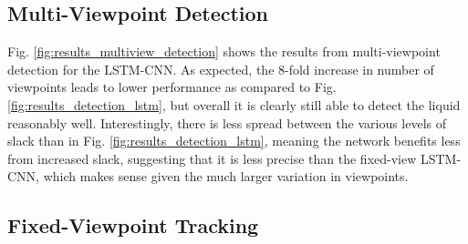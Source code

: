 \documentclass[runningheads,a4paper]{llncs}
\begin{document}
\vspace{-0.3cm}
\subsection{Multi-Viewpoint Detection}
\vspace{-0.3cm}

Fig. \ref{fig:results_multiview_detection} shows the results from multi-viewpoint detection for the LSTM-CNN. As expected, the 8-fold increase in number of viewpoints leads to lower performance as compared to Fig. \ref{fig:results_detection_lstm}, but overall it is clearly still able to detect the liquid reasonably well. Interestingly, there is less spread between the various levels of slack than in Fig. \ref{fig:results_detection_lstm}, meaning the network benefits less from increased slack, suggesting that it is less precise than the fixed-view LSTM-CNN, which makes sense given the much larger variation in viewpoints.

\vspace{-0.5cm}
\subsection{Fixed-Viewpoint Tracking}
\label{sec:results3}
\vspace{-0.3cm}
\end{document}
